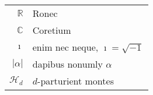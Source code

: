 \notation

\begin{center}
\begin{tabular}{r p{12cm} }
$\mathbb{R}$ & Ronec \\
$\mathbb{C}$ & Coretium   \\
$\imath$    & enim nec neque, $\imath = \sqrt{-1}$\\
 $|\alpha|$  & dapibus nonumly $\alpha$\\
 $\mathcal{H}_d$ & $d$-parturient montes \\



\end{tabular}
\end{center}
